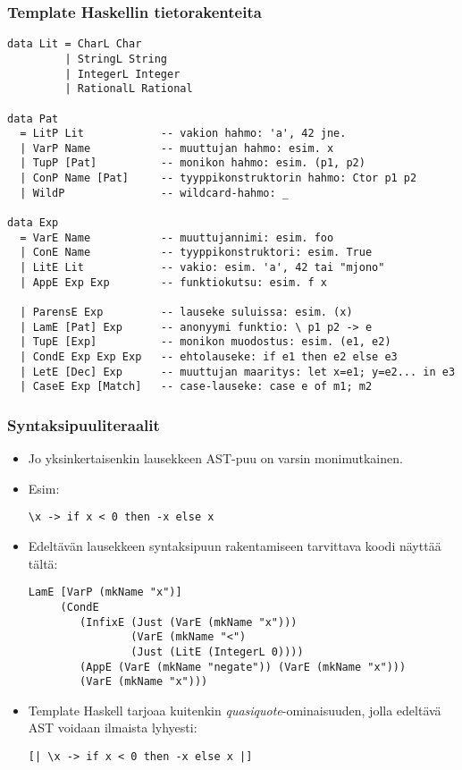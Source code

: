 \documentclass{beamer}
\begin{document}
\begin{frame}[fragile]
\frametitle{Template Haskellin tietorakenteita}
\scriptsize
\begin{itemize}
\begin{verbatim}
data Lit = CharL Char
         | StringL String
         | IntegerL Integer
         | RationalL Rational

data Pat
  = LitP Lit            -- vakion hahmo: 'a', 42 jne.
  | VarP Name           -- muuttujan hahmo: esim. x
  | TupP [Pat]          -- monikon hahmo: esim. (p1, p2)
  | ConP Name [Pat]     -- tyyppikonstruktorin hahmo: Ctor p1 p2
  | WildP               -- wildcard-hahmo: _

data Exp
  = VarE Name           -- muuttujannimi: esim. foo
  | ConE Name           -- tyyppikonstruktori: esim. True
  | LitE Lit            -- vakio: esim. 'a', 42 tai "mjono"
  | AppE Exp Exp        -- funktiokutsu: esim. f x

  | ParensE Exp         -- lauseke suluissa: esim. (x)
  | LamE [Pat] Exp      -- anonyymi funktio: \ p1 p2 -> e
  | TupE [Exp]          -- monikon muodostus: esim. (e1, e2)
  | CondE Exp Exp Exp   -- ehtolauseke: if e1 then e2 else e3
  | LetE [Dec] Exp      -- muuttujan maaritys: let x=e1; y=e2... in e3
  | CaseE Exp [Match]   -- case-lauseke: case e of m1; m2
\end{verbatim}
\end{itemize}
\end{frame}

\begin{frame}[fragile]
\frametitle{Syntaksipuuliteraalit}
\begin{itemize}
\item{Jo yksinkertaisenkin lausekkeen AST-puu on varsin monimutkainen.}
\item{Esim:}
\begin{verbatim}
\x -> if x < 0 then -x else x
\end{verbatim}
\item{Edeltävän lausekkeen syntaksipuun rakentamiseen tarvittava koodi näyttää tältä:}
\begin{verbatim}
LamE [VarP (mkName "x")]
     (CondE
        (InfixE (Just (VarE (mkName "x")))
                (VarE (mkName "<")
                (Just (LitE (IntegerL 0))))
        (AppE (VarE (mkName "negate")) (VarE (mkName "x")))
        (VarE (mkName "x")))
\end{verbatim}
\item{Template Haskell tarjoaa kuitenkin \emph{quasiquote}-ominaisuuden, jolla
    edeltävä AST voidaan ilmaista lyhyesti:}
\begin{verbatim}
[| \x -> if x < 0 then -x else x |]
\end{verbatim}
\end{itemize}
\end{frame}
\end{document}
